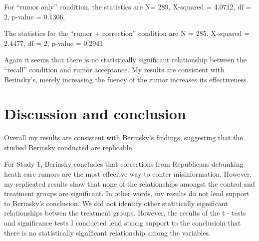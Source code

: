 \documentclass[AER]{AEA}
\begin{document}
\begin{table}

\caption{\label{tab:unnamed-chunk-18}Recall effects on rumor only conditiion in Study 2 (Wave 2)}
\centering
{}
\end{table}

For ``rumor only'' condition, the statistics are N= 289, X-squared =
4.0712, df = 2, p-value = 0.1306.

\begin{table}

\caption{\label{tab:unnamed-chunk-19}Recall effects on rumor + correction conditiion in Study 2 (Wave 2)}
\centering
{}
\end{table}

The statistics for the ``rumor + correction'' condition are N = 285,
X-squared = 2.4477, df = 2, p-value = 0.2941

Again it seems that there is no statistically significant relationship
between the ``recall'' condition and rumor acceptance. My results are
consistent with Berinsky's, merely increasing the fuency of the rumor
increases its effectiveness.

\hypertarget{discussion-and-conclusion}{%
\section{Discussion and conclusion}\label{discussion-and-conclusion}}

Overall my results are consistent with Berinsky's findings, suggesting
that the studied Berinsky conducted are replicable.

For Study 1, Berinsky concludes that corrections from Republicans
debunking heath care rumors are the most effecitve way to conter
misinformation. However, my replicated results show that none of the
relationships amongst the control and treatment groups are significant.
In other words, my results do not lend support to Berinsky's conclusion.
We did not identify other statitically significant relationships betwen
the treatment groups. However, the results of the t - tests and
significance tests I conducted lend strong support to the conclusioin
that there is no statistically significant relationship among the
variables.
\end{document}
